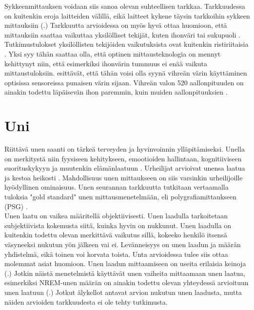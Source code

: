 \documentclass[utf8,bachelor,finnish]{bachelor}
\begin{document}
  
   Sykkeenmittauksen voidaan siis sanoa olevan suhteellisen tarkkaa.
    Tarkkuudessa on kuitenkin eroja laitteiden välillä, eikä laitteet kykene täysin tarkkoihin sykkeen mittauksiin
     (\cite{pasadyn_accuracy_2019,wang_accuracy_2017,nelson_accuracy_2019}.) Tarkkuutta arvioidessa on myös hyvä ottaa huomioon, että mittauksiin saattaa vaikuttaa
      yksilölliset tekijät, kuten ihonväri tai sukupuoli \cite{shcherbina_accuracy_2017,hochstadt_continuous_2020}.
       Tutkimustulokset yksilöllisten tekijöiden vaikutuksista ovat kuitenkin ristiriitaisia \parencite{koerber_accuracy_2022, pasadyn_accuracy_2019}.
        Yksi syy tähän saattaa olla, että optinen mittausteknologia on mennyt kehittynyt niin, että esimerkiksi ihonvärin tummuus ei enää vaikuta mittaustuloksiin.
         \textcite{koerber_accuracy_2022} esittävät, että tähän voisi olla syynä vihreän värin käyttäminen optisissa sensoreissa punaisen värin sijaan.
          Vihreän valon 520 aallonpituuden on ainakin todettu läpäisevän ihon paremmin, kuin muiden aallonpituuksien \parencite{fallow_influence_2013}.
        
       

  \section{Uni}
  Riittävä unen saanti on tärkeä terveyden ja hyvinvoinnin ylläpitämiseksi. Unella on merkitystä niin fyysiseen kehitykseen,
   emootioiden hallintaan, kognitiiviseen suorituskykyyn ja muutenkin elämänlaatuun \parencite{watson_sleep_2017}. 
    Urheilijat arvioivat unensa laatua ja kestoa heikosti \parencite{watson_sleep_2017}. Mahdollisuus unen mittaukseen
     on siis varsinkin urheilijoille hyödyllinen ominaisuus. Unen seurannan tarkkuutta tutkitaan vertaamalla tuloksia "gold standard"
      unen mittausmenetelmään, eli polygrafiamittaukseen (PSG) \parencite{de_zambotti_measures_2016, rundo_chapter_2019, miller_validation_2022}.\\
  
  Unen laatu on vaikea määritellä objektiivisesti. Unen laadulla tarkoitetaan subjektiivista kokemusta siitä, kuinka hyvin on nukkunut.
   Unen laadulla on kuitenkin todettu olevan merkittävä vaikutus sillä, kokeeko henkilö itsensä väsyneeksi nukutun yön jälkeen vai ei. Levänneisyys on
    unen laadun ja määrän yhdistelmä, eikä toinen voi korvata toista. Unta arvioidessa tulee siis ottaa molemmat asiat huomioon.
     Unen laadun mittaamiseen on useita erilaisia keinoja (\cite{kohyama_which_2021}.)
      Jotkin näistä menetelmistä käyttävät unen vaiheita mittaamaan unen laatua, esimerkiksi
       NREM-unen määrän on ainakin todettu olevan yhteydessä arvioituun unen laatuun (\cite{krystal_measuring_2008}.)
        Jotkut älykellot antavat arvion nukutun unen laadusta, mutta näiden arvioiden tarkkuudesta ei ole tehty tutkimusta.\\
  
\end{document}
